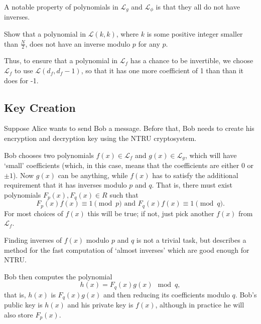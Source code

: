 A notable property of polynomials in $\mathcal{L}_g$ and $\mathcal{L}_\phi$ is that they all do not have inverses.
\begin{exercise}
    Show that a polynomial in $\mathcal{L}(k,k)$, where $k$ is some positive integer smaller than $\frac N2$, does not have an inverse modulo $p$ for any $p$.
\end{exercise}
Thus, to ensure that a polynomial in $\mathcal{L}_f$ has a chance to be invertible, we choose $\mathcal{L}_f$ to use $ \mathcal{L}(d_f, d_f-1)$, so that it has one more coefficient of 1 than than it does for -1.

\subsection{Key Creation}
Suppose Alice wants to send Bob a message. Before that, Bob needs to create his encryption and decryption key using the NTRU cryptosystem.

Bob chooses two polynomials $f(x) \in \mathcal{L}_f$ and $g(x) \in \mathcal{L}_g$, which will have `small' coefficients (which, in this case, means that the coefficients are either 0 or $\pm1$). Now $g(x)$ can be anything, while $f(x)$ has to satisfy the additional requirement that it has inverses modulo $p$ and $q$. That is, there must exist polynomials $F_p(x), F_q(x) \in R$ such that
\[
    F_p(x)f(x) \equiv 1 \pmod p \text{ and } F_q(x)f(x) \equiv 1 \pmod q.
\]
For most choices of $f(x)$ this will be true; if not, just pick another $f(x)$ from $\mathcal{L}_f$.
\begin{remark}
    Finding inverses of $f(x)$ modulo $p$ and $q$ is not a trivial task, but \cite{silverman_1999} describes a method for the fast computation of `almost inverses' which are good enough for NTRU.
\end{remark}

Bob then computes the polynomial
\[
    h(x) = F_q(x)g(x) \mod q,
\]
that is, $h(x)$ is $F_q(x)g(x)$ and then reducing its coefficients modulo $q$. Bob's public key is $h(x)$ and his private key is $f(x)$, although in practice he will also store $F_p(x)$.

